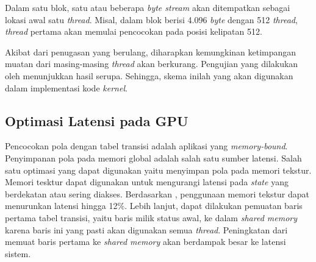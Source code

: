       Dalam satu blok, satu atau beberapa \emph{byte stream} akan ditempatkan sebagai lokasi awal satu \emph{thread}. Misal, dalam blok berisi 4.096 \emph{byte} dengan 512 \emph{thread}, \emph{thread} pertama akan memulai pencocokan pada posisi kelipatan 512. 

      Akibat dari penugasan yang berulang, diharapkan kemungkinan ketimpangan muatan dari masing-masing \emph{thread} akan berkurang. Pengujian yang dilakukan oleh \cite{lin2013} menunjukkan hasil serupa. Sehingga, skema inilah yang akan digunakan dalam implementasi kode \emph{kernel}. %
      
      
      
      \subsection{Optimasi Latensi pada GPU}
      
      Pencocokan pola dengan tabel transisi adalah aplikasi yang \emph{memory-bound}. Penyimpanan pola pada memori global adalah salah satu sumber latensi. Salah satu optimasi yang dapat digunakan yaitu menyimpan pola pada memori tekstur. Memori tesktur dapat digunakan untuk mengurangi latensi pada \emph{state} yang berdekatan atau sering diakses. Berdasarkan \cite{lin2013}, penggunaan memori tekstur dapat menurunkan latensi hingga 12\%. Lebih lanjut, dapat dilakukan pemuatan baris pertama tabel transisi, yaitu baris milik status awal, ke dalam \emph{shared memory} karena baris ini yang pasti akan digunakan semua \emph{thread}. Peningkatan dari memuat baris pertama ke \emph{shared memory} akan berdampak besar ke latensi sistem.
      
      
